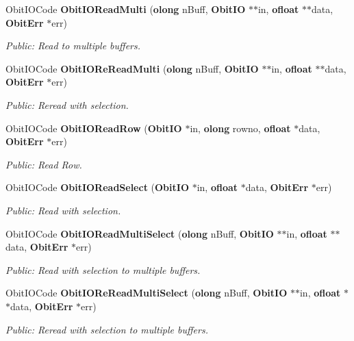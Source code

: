 \begin{CompactItemize}
Obit\-IOCode {\bf Obit\-IORead\-Multi} ({\bf olong} n\-Buff, {\bf Obit\-IO} $\ast$$\ast$in, {\bf ofloat} $\ast$$\ast$data, {\bf Obit\-Err} $\ast$err)
\begin{CompactList}\small\item\em Public: Read to multiple buffers. \item\end{CompactList}\item 
Obit\-IOCode {\bf Obit\-IORe\-Read\-Multi} ({\bf olong} n\-Buff, {\bf Obit\-IO} $\ast$$\ast$in, {\bf ofloat} $\ast$$\ast$data, {\bf Obit\-Err} $\ast$err)
\begin{CompactList}\small\item\em Public: Reread with selection. \item\end{CompactList}\item 
Obit\-IOCode {\bf Obit\-IORead\-Row} ({\bf Obit\-IO} $\ast$in, {\bf olong} rowno, {\bf ofloat} $\ast$data, {\bf Obit\-Err} $\ast$err)
\begin{CompactList}\small\item\em Public: Read Row. \item\end{CompactList}\item 
Obit\-IOCode {\bf Obit\-IORead\-Select} ({\bf Obit\-IO} $\ast$in, {\bf ofloat} $\ast$data, {\bf Obit\-Err} $\ast$err)
\begin{CompactList}\small\item\em Public: Read with selection. \item\end{CompactList}\item 
Obit\-IOCode {\bf Obit\-IORead\-Multi\-Select} ({\bf olong} n\-Buff, {\bf Obit\-IO} $\ast$$\ast$in, {\bf ofloat} $\ast$$\ast$data, {\bf Obit\-Err} $\ast$err)
\begin{CompactList}\small\item\em Public: Read with selection to multiple buffers. \item\end{CompactList}\item 
Obit\-IOCode {\bf Obit\-IORe\-Read\-Multi\-Select} ({\bf olong} n\-Buff, {\bf Obit\-IO} $\ast$$\ast$in, {\bf ofloat} $\ast$$\ast$data, {\bf Obit\-Err} $\ast$err)
\begin{CompactList}\small\item\em Public: Reread with selection to multiple buffers. \item\end{CompactList}\item 

\end{CompactItemize}
